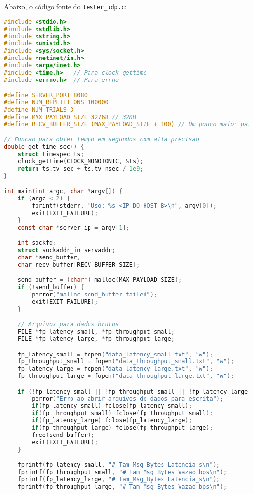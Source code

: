 Abaixo, o código fonte do \texttt{tester\_udp.c}:
\begin{lstlisting}[language=C, caption={Código fonte do Testador UDP (tester\_udp.c)}, label={lst:tester_udp}]
#include <stdio.h>
#include <stdlib.h>
#include <string.h>
#include <unistd.h>
#include <sys/socket.h>
#include <netinet/in.h>
#include <arpa/inet.h>
#include <time.h>   // Para clock_gettime
#include <errno.h>  // Para errno

#define SERVER_PORT 8080
#define NUM_REPETITIONS 100000
#define NUM_TRIALS 3
#define MAX_PAYLOAD_SIZE 32768 // 32KB
#define RECV_BUFFER_SIZE (MAX_PAYLOAD_SIZE + 100) // Um pouco maior para seguranca

// Funcao para obter tempo em segundos com alta precisao
double get_time_sec() {
    struct timespec ts;
    clock_gettime(CLOCK_MONOTONIC, &ts);
    return ts.tv_sec + ts.tv_nsec / 1e9;
}

int main(int argc, char *argv[]) {
    if (argc < 2) {
        fprintf(stderr, "Uso: %s <IP_DO_HOST_B>\n", argv[0]);
        exit(EXIT_FAILURE);
    }
    const char *server_ip = argv[1];

    int sockfd;
    struct sockaddr_in servaddr;
    char *send_buffer;
    char recv_buffer[RECV_BUFFER_SIZE];

    send_buffer = (char*) malloc(MAX_PAYLOAD_SIZE);
    if (!send_buffer) {
        perror("malloc send_buffer failed");
        exit(EXIT_FAILURE);
    }

    // Arquivos para dados brutos
    FILE *fp_latency_small, *fp_throughput_small;
    FILE *fp_latency_large, *fp_throughput_large;

    fp_latency_small = fopen("data_latency_small.txt", "w");
    fp_throughput_small = fopen("data_throughput_small.txt", "w");
    fp_latency_large = fopen("data_latency_large.txt", "w");
    fp_throughput_large = fopen("data_throughput_large.txt", "w");

    if (!fp_latency_small || !fp_throughput_small || !fp_latency_large || !fp_throughput_large) {
        perror("Erro ao abrir arquivos de dados para escrita");
        if(fp_latency_small) fclose(fp_latency_small);
        if(fp_throughput_small) fclose(fp_throughput_small);
        if(fp_latency_large) fclose(fp_latency_large);
        if(fp_throughput_large) fclose(fp_throughput_large);
        free(send_buffer);
        exit(EXIT_FAILURE);
    }

    fprintf(fp_latency_small, "# Tam_Msg_Bytes Latencia_s\n");
    fprintf(fp_throughput_small, "# Tam_Msg_Bytes Vazao_bps\n");
    fprintf(fp_latency_large, "# Tam_Msg_Bytes Latencia_s\n");
    fprintf(fp_throughput_large, "# Tam_Msg_Bytes Vazao_bps\n");



\end{lstlisting}
